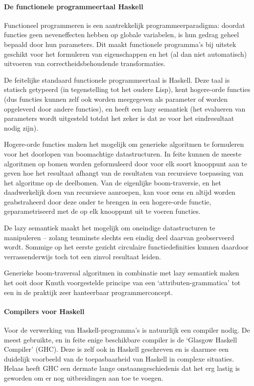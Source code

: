 \documentclass{article}
\begin{document}
\paragraph{De functionele programmeertaal Haskell}

Functioneel programmeren is een aantrekkelijk programmeerparadigma:
doordat functies geen neveneffecten hebben op globale variabelen,
is hun gedrag geheel bepaald door hun parameters.
Dit maakt functionele programma's bij uitstek geschikt voor het formuleren
van eigenschappen en het (al dan niet automatisch) uitvoeren van correctheidsbehoudende
transformaties.

De feitelijke standaard functionele programmeertaal is Haskell. Deze taal is
statisch getypeerd (in tegenstelling tot het oudere Lisp),
kent hogere-orde functies (dus functies kunnen zelf ook worden meegegeven als parameter
of worden opgeleverd door andere functies), en 
heeft een lazy semantiek (het evalueren van parameters wordt uitgesteld totdat
het zeker is dat ze voor het eindresultaat nodig zijn).

Hogere-orde functies maken het mogelijk om generieke algoritmen te formuleren voor
het doorlopen van boomachtige datastructuren. In feite kunnen de meeste algoritmen op
bomen worden geformuleerd door voor elk soort knooppunt aan te geven hoe het resultaat
afhangt van de resultaten van recursieve toepassing van het algoritme op de deelbomen.
Van de eigenlijke boom-traversie, en het daadwerkelijk doen van recursieve aanroepen,
kan voor eens en altijd worden geabstraheerd door deze onder te brengen in een
hogere-orde functie, geparametriseerd met de op elk knooppunt uit te voeren functies.

De lazy semantiek maakt het mogelijk om oneindige datastructuren te manipuleren -- zolang
tenminste slechts een eindig deel daarvan geobserveerd wordt.
Sommige op het eerste gezicht circulaire functiedefinities kunnen daardoor verrassenderwijs toch
tot een zinvol resultaat leiden.

Generieke boom-traversal algoritmen in combinatie met lazy semantiek maken het ooit door Knuth
voorgestelde principe van een `attributen-grammatica' tot een in de praktijk zeer
hanteerbaar programmerconcept.

\paragraph{Compilers voor Haskell}

Voor de verwerking van Haskell-programma's is natuurlijk een compiler nodig.
De meest gebruikte, en in feite enige beschikbare compiler is de `Glasgow Haskell Compiler' (GHC).
Deze is zelf ook in Haskell geschreven en is daarmee een duidelijk voorbeeld van
de toepasbaarheid van Haskell in complexe situaties.
Helaas heeft GHC een dermate lange onstaansgeschiedenis dat het erg lastig is geworden
om er nog uitbreidingen aan toe te voegen.
\end{document}

